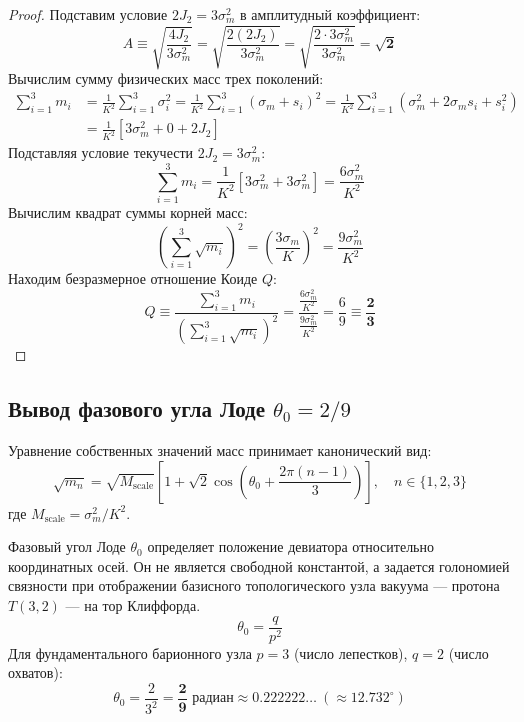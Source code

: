 \documentclass[12pt,a4paper]{article}
\begin{document}
	\begin{proof}
		Подставим условие $2 J_2 = 3 \sigma_m^2$ в амплитудный коэффициент:
		\begin{equation}
			A \equiv \sqrt{\frac{4 J_2}{3 \sigma_m^2}} = \sqrt{\frac{2 (2 J_2)}{3 \sigma_m^2}} = \sqrt{\frac{2 \cdot 3 \sigma_m^2}{3 \sigma_m^2}} = \mathbf{\sqrt{2}}
		\end{equation}
		Вычислим сумму физических масс трех поколений:
		\begin{align}
			\sum_{i=1}^3 m_i &= \frac{1}{K^2} \sum_{i=1}^3 \sigma_i^2 = \frac{1}{K^2} \sum_{i=1}^3 \left( \sigma_m + s_i \right)^2 = \frac{1}{K^2} \sum_{i=1}^3 \left( \sigma_m^2 + 2\sigma_m s_i + s_i^2 \right) \nonumber \\
			&= \frac{1}{K^2} \left[ 3 \sigma_m^2 + 0 + 2 J_2 \right]
		\end{align}
		Подставляя условие текучести $2 J_2 = 3 \sigma_m^2$:
		\begin{equation}
			\sum_{i=1}^3 m_i = \frac{1}{K^2} \left[ 3 \sigma_m^2 + 3 \sigma_m^2 \right] = \frac{6 \sigma_m^2}{K^2}
		\end{equation}
		Вычислим квадрат суммы корней масс:
		\begin{equation}
			\left( \sum_{i=1}^3 \sqrt{m_i} \right)^2 = \left( \frac{3 \sigma_m}{K} \right)^2 = \frac{9 \sigma_m^2}{K^2}
		\end{equation}
		Находим безразмерное отношение Коиде $Q$:
		\begin{equation}
			Q \equiv \frac{\sum_{i=1}^3 m_i}{\left( \sum_{i=1}^3 \sqrt{m_i} \right)^2} = \frac{\frac{6 \sigma_m^2}{K^2}}{\frac{9 \sigma_m^2}{K^2}} = \frac{6}{9} \equiv \mathbf{\frac{2}{3}}
		\end{equation}
	\end{proof}
	
	\subsection{Вывод фазового угла Лоде $\theta_0 = 2/9$}
	Уравнение собственных значений масс принимает канонический вид:
	\begin{equation}
		\sqrt{m_n} = \sqrt{M_{\text{scale}}} \left[ 1 + \sqrt{2} \cos\left( \theta_0 + \frac{2\pi(n-1)}{3} \right) \right], \quad n \in \{1, 2, 3\}
	\end{equation}
	где $M_{\text{scale}} = \sigma_m^2 / K^2$.
	
	Фазовый угол Лоде $\theta_0$ определяет положение девиатора относительно координатных осей. Он не является свободной константой, а задается голономией связности при отображении базисного топологического узла вакуума — протона $T(3,2)$ — на тор Клиффорда.
	\begin{equation}
		\theta_0 = \frac{q}{p^2}
	\end{equation}
	Для фундаментального барионного узла $p=3$ (число лепестков), $q=2$ (число охватов):
	\begin{equation}
		\theta_0 = \frac{2}{3^2} = \mathbf{\frac{2}{9} \text{ радиан}} \approx 0.222222 \dots \ (\approx 12.732^\circ)
	\end{equation}
	
\end{document}
